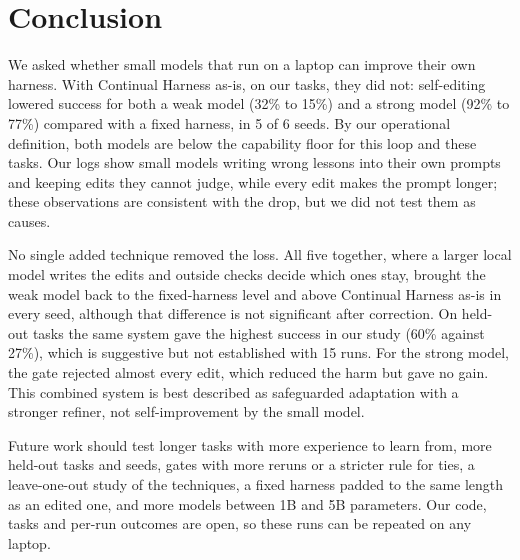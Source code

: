 \section{Conclusion}
\label{sec:conclusion}

We asked whether small models that run on a laptop can improve their own harness. With Continual
Harness as-is, on our tasks, they did not: self-editing lowered success for both a weak model (32\%
to 15\%) and a strong model (92\% to 77\%) compared with a fixed harness, in 5 of 6 seeds. By our
operational definition, both models are below the capability floor for this loop and these tasks.
Our logs show small models writing wrong lessons into their own prompts and keeping edits they
cannot judge, while every edit makes the prompt longer; these observations are consistent with the
drop, but we did not test them as causes.

No single added technique removed the loss. All five together, where a larger local model writes
the edits and outside checks decide which ones stay, brought the weak model back to the
fixed-harness level and above Continual Harness as-is in every seed, although that difference is
not significant after correction. On held-out tasks the same system gave the highest success in our
study (60\% against 27\%), which is suggestive but not established with 15 runs. For the strong
model, the gate rejected almost every edit, which reduced the harm but gave no gain. This combined
system is best described as safeguarded adaptation with a stronger refiner, not self-improvement by
the small model.

Future work should test longer tasks with more experience to learn from, more held-out tasks and
seeds, gates with more reruns or a stricter rule for ties, a leave-one-out study of the techniques,
a fixed harness padded to the same length as an edited one, and more models between 1B and 5B
parameters. Our code, tasks and per-run outcomes are open, so these runs can be repeated on any
laptop.
